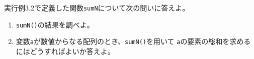 \begin{Prob}\upshape
  実行例3.2で定義した関数\texttt{sumN}について次の問いに答えよ。
  \begin{enumerate}
   \item \texttt{sumN()}の結果を調べよ。
         \ifText\\[0.03\textheight]\fi
   \item 変数\texttt{a}が数値からなる配列のとき、\texttt{sumN()}を用いて
         \texttt{a}の要素の総和を求めるにはどうすればよいか答えよ。
         \ifText\\[0.03\textheight]\fi
  \end{enumerate}
\end{Prob}
